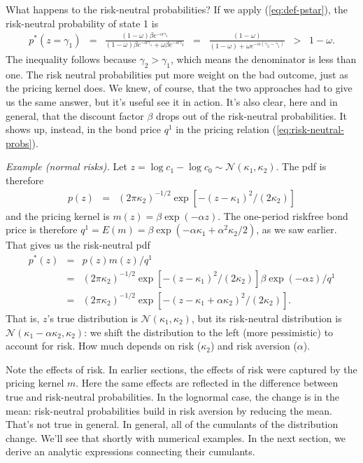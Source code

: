 \documentclass[11pt]{article}
\begin{document}
What happens to the risk-neutral probabilities?
If we apply (\ref{eq:def-pstar}),
the risk-neutral probability of state 1 is
\begin{eqnarray*}
        p^*(z=\gamma_1)
            &=& \frac{(1-\omega) \beta e^{-\alpha \gamma_1}}
                    {(1-\omega) \beta e^{-\alpha \gamma_1} + \omega \beta e^{-\alpha \gamma_2}}
            \;\;=\;\; \frac{(1-\omega)}
                    {(1-\omega) + \omega e^{-\alpha (\gamma_2-\gamma_1)}}
            \;\;>\;\; 1-\omega .
\end{eqnarray*}
The inequality follows because $\gamma_2 > \gamma_1$,
which means the denominator is less than one.
The risk neutral probabilities put more weight
on the bad outcome, just as the pricing kernel does.
We knew, of course, that the two approaches had to give us the same answer,
but it's useful see it in action.
It's also clear, here and in general, that the discount factor $\beta$
drops out of the risk-neutral probabilities.
It shows up, instead, in the bond price $q^1$ in the pricing relation
(\ref{eq:risk-neutral-probs}).

{\it Example (normal risks).\/}
Let $ z = \log c_1 - \log c_0 \sim \mathcal{N}(\kappa_1, \kappa_2) $.
The pdf is therefore
\begin{eqnarray*}
    p(z) &=& (2 \pi \kappa_2)^{-1/2} \exp[ - (z-\kappa_1)^2/(2\kappa_2)]
\end{eqnarray*}
and the pricing kernel is $m(z) = \beta \exp(-\alpha z)$.
The one-period riskfree bond price is therefore
$ q^1 = E(m) = \beta \exp(-\alpha \kappa_1 + \alpha^2 \kappa_2/2)$,
as we saw earlier.
That gives us the risk-neutral pdf
\begin{eqnarray*}
    p^*(z)  &=& p(z) m (z) /q^1 \\
            &=& (2 \pi \kappa_2)^{-1/2} \exp[ - (z-\kappa_1)^2/(2\kappa_2)]
                        \beta \exp(-\alpha z)/q^1 \\
            &=& (2 \pi \kappa_2)^{-1/2} \exp[ - (z-\kappa_1+\alpha \kappa_2)^2/(2\kappa_2)] .
\end{eqnarray*}
That is, $z$'s true distribution is $\mathcal{N}(\kappa_1,\kappa_2)$,
but its risk-neutral distribution is $\mathcal{N}(\kappa_1-\alpha \kappa_2,\kappa_2)$:
we shift the distribution to the left (more pessimistic) to account
for risk.  How much depends on risk ($\kappa_2$) and risk aversion ($\alpha$).


Note the effects of risk.
In earlier sections, the effects of risk were captured by the pricing kernel $m$.
Here the same effects are reflected in the difference between
true and risk-neutral probabilities.
In the lognormal case, the change is in the mean:  risk-neutral
probabilities build in risk aversion by reducing the mean.
That's not true in general.
In general, all of the cumulants of the distribution change.
We'll see that shortly with numerical examples.
In the next section, we derive an analytic expressions connecting
their cumulants.
\end{document}
